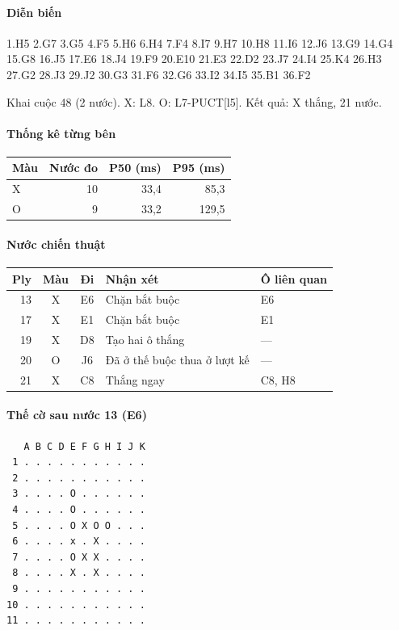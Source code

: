\paragraph{Diễn biến}
{\footnotesize 1.H5 2.G7 3.G5 4.F5 5.H6 6.H4 7.F4 8.I7 9.H7 10.H8 11.I6 12.J6 13.G9 14.G4 15.G8 16.J5 17.E6 18.J4 19.F9 20.E10 21.E3 22.D2 23.J7 24.I4 25.K4 26.H3 27.G2 28.J3 29.J2 30.G3 31.F6 32.G6 33.I2 34.I5 35.B1 36.F2\par}
Khai cuộc 48 (2 nước). X: L8. O: L7-PUCT[l5]. Kết quả: X thắng, 21 nước.
\paragraph{Thống kê từng bên}
\begin{center}\small
\begin{tabular}{@{}lrrr@{}}
\toprule
Màu & Nước đo & P50 (ms) & P95 (ms) \\
\midrule
X & 10 & 33,4 & 85,3 \\
O & 9 & 33,2 & 129,5 \\
\bottomrule
\end{tabular}
\end{center}
\paragraph{Nước chiến thuật}
\begin{center}\small
\begin{tabular}{@{}rccll@{}}
\toprule
Ply & Màu & Đi & Nhận xét & Ô liên quan \\
\midrule
13 & X & E6 & Chặn bắt buộc & E6 \\
17 & X & E1 & Chặn bắt buộc & E1 \\
19 & X & D8 & Tạo hai ô thắng & — \\
20 & O & J6 & Đã ở thế buộc thua ở lượt kế & — \\
21 & X & C8 & Thắng ngay & C8, H8 \\
\bottomrule
\end{tabular}
\end{center}
\paragraph{Thế cờ sau nước 13 (E6)}
\begin{verbatim}
   A B C D E F G H I J K
 1 . . . . . . . . . . .
 2 . . . . . . . . . . .
 3 . . . . O . . . . . .
 4 . . . . O . . . . . .
 5 . . . . O X O O . . .
 6 . . . . x . X . . . .
 7 . . . . O X X . . . .
 8 . . . . X . X . . . .
 9 . . . . . . . . . . .
10 . . . . . . . . . . .
11 . . . . . . . . . . .
\end{verbatim}
